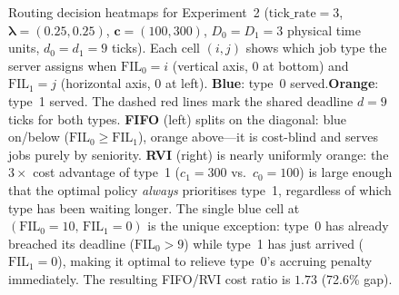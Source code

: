 \documentclass[11pt,a4paper]{article}
\begin{document}
\begin{figure}[htbp]
\begin{tikzpicture}[x=0.46cm, y=0.46cm]
\end{tikzpicture}
\caption{%
  Routing decision heatmaps for Experiment~2
  ($\text{tick\_rate}=3$,\;
   $\boldsymbol{\lambda}=(0.25,0.25)$,\;
   $\mathbf{c}=(100,300)$,\;
   $D_0=D_1=3$ physical time units, $d_0=d_1=9$ ticks).
  Each cell $(i,j)$ shows which job type the server assigns when
  $\mathrm{FIL}_0=i$ (vertical axis, $0$ at bottom) and
  $\mathrm{FIL}_1=j$ (horizontal axis, $0$ at left).
  \textbf{Blue}: type~0 served.\quad\textbf{Orange}: type~1 served.
  The dashed red lines mark the shared deadline $d=9$ ticks for both types.
  \textbf{FIFO} (left) splits on the diagonal:
  blue on/below ($\mathrm{FIL}_0 \ge \mathrm{FIL}_1$), orange above---it
  is cost-blind and serves jobs purely by seniority.
  \textbf{RVI} (right) is nearly uniformly orange: the $3\times$ cost advantage
  of type~1 ($c_1=300$ vs.\ $c_0=100$) is large enough that the optimal policy
  \emph{always} prioritises type~1, regardless of which type has been waiting longer.
  The single blue cell at $(\mathrm{FIL}_0{=}10,\,\mathrm{FIL}_1{=}0)$ is the
  unique exception: type~0 has already breached its deadline ($\mathrm{FIL}_0>9$)
  while type~1 has just arrived ($\mathrm{FIL}_1=0$), making it optimal to
  relieve type~0's accruing penalty immediately.
  The resulting FIFO/RVI cost ratio is $1.73$ (72.6\% gap).%
}
\label{fig:heatmap_exp2}
\end{figure}
\end{document}
